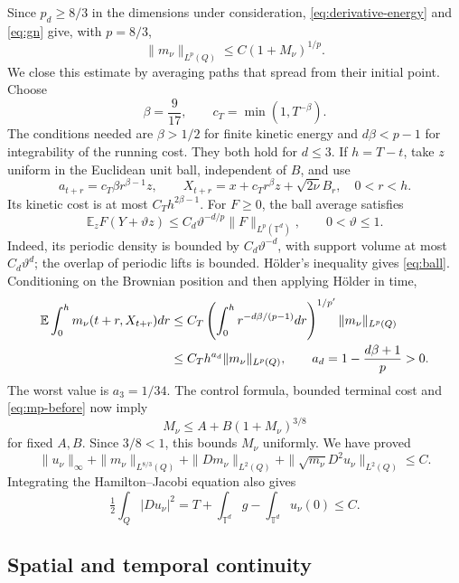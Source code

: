 \documentclass[11pt]{article}
\newcommand{\T}{\mathbb T}
\numberwithin{equation}{section}
\begin{document}
Since \(p_d\ge8/3\) in the dimensions under consideration,
\eqref{eq:derivative-energy} and \eqref{eq:gn} give, with \(p=8/3\),
\begin{equation}\label{eq:mp-before}
 \|m_\nu\|_{L^p(Q)}\le C(1+M_\nu)^{1/p}.
\end{equation}
We close this estimate by averaging paths that spread from their initial
point. Choose
\[
 \beta=\frac9{17},\qquad c_T=\min(1,T^{-\beta}).
\]
The conditions needed are \(\beta>1/2\) for finite kinetic energy and
\(d\beta<p-1\) for integrability of the running cost. They both hold
for \(d\le3\). If \(h=T-t\), take \(z\) uniform in the Euclidean unit
ball, independent of \(B\), and use
\[
 a_{t+r}=c_T\beta r^{\beta-1}z,\qquad
 X_{t+r}=x+c_Tr^\beta z+\sqrt{2\nu}B_r,\quad 0<r<h.
\]
Its kinetic cost is at most \(C_T h^{2\beta-1}\).
For \(F\ge0\), the ball average satisfies
\begin{equation}\label{eq:ball}
 \mathbb E_z F(Y+\vartheta z)
   \le C_d\vartheta^{-d/p}\|F\|_{L^p(\T^d)},\qquad
           0<\vartheta\le1 .
\end{equation}
Indeed, its periodic density is bounded by \(C_d\vartheta^{-d}\),
with support volume at most \(C_d\vartheta^d\); the overlap of periodic
lifts is bounded. H\"older's inequality gives \eqref{eq:ball}.
Conditioning on the Brownian position and then applying H\"older in time,
\begin{align}
 \mathbb E\int_0^h m_\nu(t+r,X_{t+r})dr
 &\le C_T
   \left(\int_0^h r^{-d\beta/(p-1)}dr\right)^{1/p'}
       \|m_\nu\|_{L^p(Q)} \notag\\
 &\le C_T h^{a_d}\|m_\nu\|_{L^p(Q)},\qquad
       a_d=1-\frac{d\beta+1}{p}>0 .\label{eq:spread-cost}
\end{align}
The worst value is \(a_3=1/34\).
The control formula, bounded terminal cost and \eqref{eq:mp-before}
now imply
\[
 M_\nu\le A+B(1+M_\nu)^{3/8}
\]
for fixed \(A,B\). Since \(3/8<1\), this bounds \(M_\nu\) uniformly.
We have proved
\begin{equation}\label{eq:uniform-bounds}
 \|u_\nu\|_\infty+\|m_\nu\|_{L^{8/3}(Q)}
 +\|Dm_\nu\|_{L^2(Q)}
 +\|\sqrt{m_\nu}D^2u_\nu\|_{L^2(Q)}\le C .
\end{equation}
Integrating the Hamilton--Jacobi equation also gives
\begin{equation}\label{eq:Du}
 \tfrac12\int_Q|Du_\nu|^2
      =T+\int_{\T^d}g-\int_{\T^d}u_\nu(0)\le C .
\end{equation}

\subsection{Spatial and temporal continuity}
\end{document}
